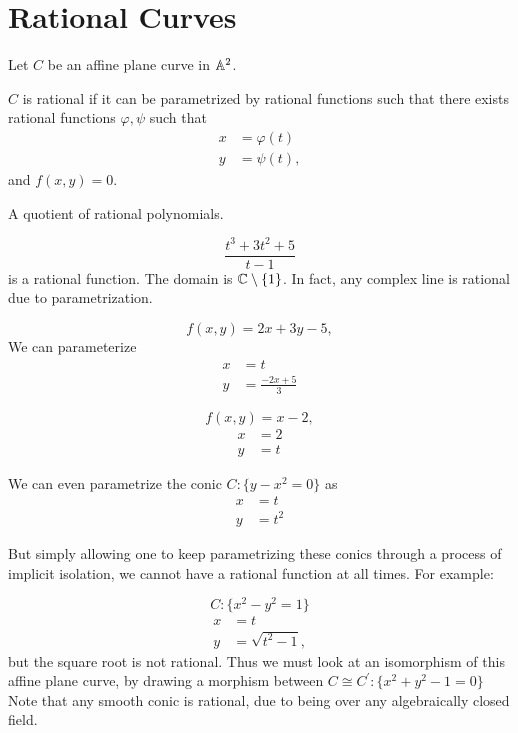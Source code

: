 
\section{Rational Curves}

Let $C$ be an affine plane curve in $\aa^2$.

\begin{definition}[Rational]
    $C$ is rational if it can be parametrized by rational functions such that there exists rational functions $\varphi,\psi$ such that
    \begin{align*}
        x &= \varphi(t)\\
        y &= \psi(t),
    \end{align*}
    and $f(x,y) = 0$.
\end{definition}

\begin{definition}
    A quotient of rational polynomials.
\end{definition}

\[
\frac{t^3 + 3t^2 + 5}{t - 1}
\]
is a rational function.
The domain is $\c\setminus\{1\}$.
In fact, any complex line is rational due to parametrization.

\[
f(x,y) = 2x + 3y - 5,
\]
We can parameterize
\begin{align*}
    x &= t\\
    y &= \frac{-2x + 5}{3}
\end{align*}

\[
f(x,y) = x - 2,
\]
\begin{align*}
    x &= 2\\
    y &= t
\end{align*}

We can even parametrize the conic $C: \{y - x^2 = 0\}$ as
\begin{align*}
    x &= t\\
    y &= t^2
\end{align*}

But simply allowing one to keep parametrizing these conics through a process of implicit isolation, we cannot have a rational function at all times.
For example:

\[
C: \{x^2 - y^2 = 1\}
\]
\begin{align*}
    x &= t\\
    y &= \sqrt{t^2 - 1},
\end{align*}
but the square root is not rational.
Thus we must look at an isomorphism of this affine plane curve, by drawing a morphism between $C\cong C^{'} : \{x^2 + y^2 - 1 = 0\}$
Note that any smooth conic is rational, due to being over any algebraically closed field.

